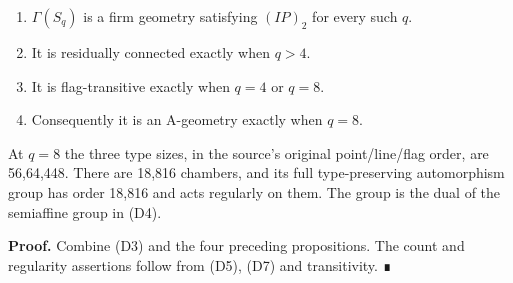\begin{enumerate}
\def\labelenumi{\arabic{enumi}.}
\tightlist
\item
  \(\Gamma(S_q)\) is a firm geometry satisfying \((IP)_2\) for every
  such \(q\).
\item
  It is residually connected exactly when \(q>4\).
\item
  It is flag-transitive exactly when \(q=4\) or \(q=8\).
\item
  Consequently it is an A-geometry exactly when \(q=8\).
\end{enumerate}

At \(q=8\) the three type sizes, in the source's original
point/line/flag order, are 56,64,448. There are 18,816 chambers, and its
full type-preserving automorphism group has order 18,816 and acts
regularly on them. The group is the dual of the semiaffine group in
(D4).

\textbf{Proof.} Combine (D3) and the four preceding propositions. The
count and regularity assertions follow from (D5), (D7) and transitivity.
∎
